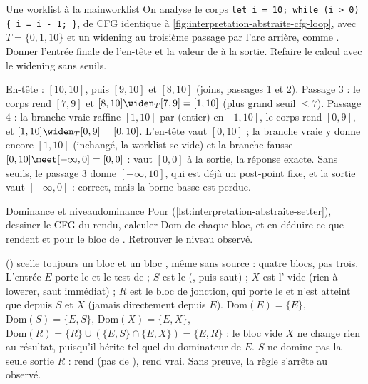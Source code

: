 \begin{exercice}{Une worklist à la main}{worklist}
  On analyse le corps \texttt{let i = 10; while (i > 0) \{ i = i - 1; \}},
  de CFG identique à \cref{fig:interpretation-abstraite-cfg-loop}, avec
  $T = \{0, 1, 10\}$ et un widening au troisième passage par l'arc arrière,
  comme . Donner l'entrée finale de l'en-tête et la valeur
  de  à la sortie. Refaire le calcul avec le widening sans seuils.
\end{exercice}
\begin{solution}
  En-tête : $[10,10]$, puis $[9,10]$ et $[8,10]$ (joins, passages 1 et 2).
  Passage 3 : le corps rend $[7,9]$ et
  $[8,10] \widen_T [7,9] = [1,10]$ (plus grand seuil $\le 7$). Passage 4 :
  la branche vraie raffine $[1,10]$ par  (entier) en $[1,10]$, le
  corps rend $[0,9]$, et $[1,10] \widen_T [0,9] = [0,10]$. L'en-tête vaut
  $[0,10]$ ; la branche vraie y donne encore $[1,10]$ (inchangé, la worklist se
  vide) et la branche fausse $[0,10] \meet [-\infty,0] = [0,0]$ : 
  vaut $[0,0]$ à la sortie, la réponse exacte. Sans seuils, le passage 3 donne
  $[-\infty,10]$, qui est déjà un post-point fixe, et la sortie vaut
  $[-\infty, 0]$ : correct, mais la borne basse est perdue.
\end{solution}

\begin{exercice}{Dominance et niveau}{dominance}
  Pour  (\cref{lst:interpretation-abstraite-setter}),
  dessiner le CFG du rendu, calculer $\mathrm{Dom}$ de chaque bloc, et en
  déduire ce que rendent  et  pour le bloc
  de . Retrouver le niveau observé.
\end{exercice}
\begin{solution}
   () scelle
  toujours un bloc  et un bloc , même sans
   source : quatre blocs, pas trois. L'entrée $E$ porte le
   et le test de  ; $S$ est le 
  (, puis saut) ; $X$ est l' vide (rien à lowerer,
  saut immédiat) ; $R$ est le bloc de jonction, qui porte le  et
  n'est atteint que depuis $S$ et $X$ (jamais directement depuis $E$).
  $\mathrm{Dom}(E) = \{E\}$, $\mathrm{Dom}(S) = \{E, S\}$,
  $\mathrm{Dom}(X) = \{E, X\}$,
  $\mathrm{Dom}(R) = \{R\} \cup (\{E,S\} \cap \{E,X\}) = \{E, R\}$ : le bloc
  vide $X$ ne change rien au résultat, puisqu'il hérite tel quel du
  dominateur de $E$. $S$ ne domine pas la seule sortie $R$ : 
  rend  (pas de ),  rend
  vrai. Sans preuve, la règle  s'arrête au
  \Warning{} observé.
\end{solution}

